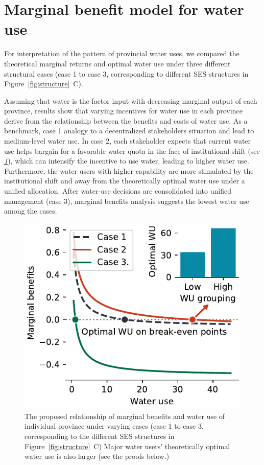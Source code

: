 \documentclass[preprint, 12pt]{elsarticle}
\providecommand{\DIFaddbegin}{} %
\providecommand{\DIFaddend}{} %
\begin{document}
\DIFaddbegin

\DIFaddend \newpage
\section{Marginal benefit model for water use}\label{secS4}
\renewcommand{\thefigure}{C\arabic{figure}}
\renewcommand{\thetable}{C\arabic{table}}
\setcounter{figure}{0}
\setcounter{table}{0}


\DIFaddbegin

\DIFaddend For interpretation of the pattern of provincial water uses, we compared the theoretical marginal returns and optimal water use under three different structural cases (case 1 to case 3, corresponding to different SES structures in Figure~\ref{fig:structure}~C).

Assuming that water is the factor input with decreasing marginal output of each province, results show that varying incentives for water use in each province derive from the relationship between the benefits and costs of water use.
As a benchmark, case 1 analogy to a decentralized stakeholders situation and lead to medium-level water use.
In case 2, each stakeholder expects that current water use helps bargain for a favorable water quota in the face of institutional shift (see \textit{\ref{secS4}}), which can intensify the incentive to use water, leading to higher water use.
Furthermore, the water users with higher capability are more stimulated by the institutional shift and away from the theoretically optimal water use under a unified allocation.
After water-use decisions are consolidated into unified management (case 3), marginal benefits analysis suggests the lowest water use among the cases.


\begin{figure}[!htb]
	\centering
	\includegraphics[width=0.6\linewidth]{outputs/economic_model.pdf}
	\caption{
		The proposed relationship of marginal benefits and water use of individual province under varying cases (case 1 to case 3, corresponding to the different SES structures in Figure~\ref{fig:structure}~C) Major water users' theoretically optimal water use is also larger (see the proofs below.)}
\end{figure}
\end{document}
